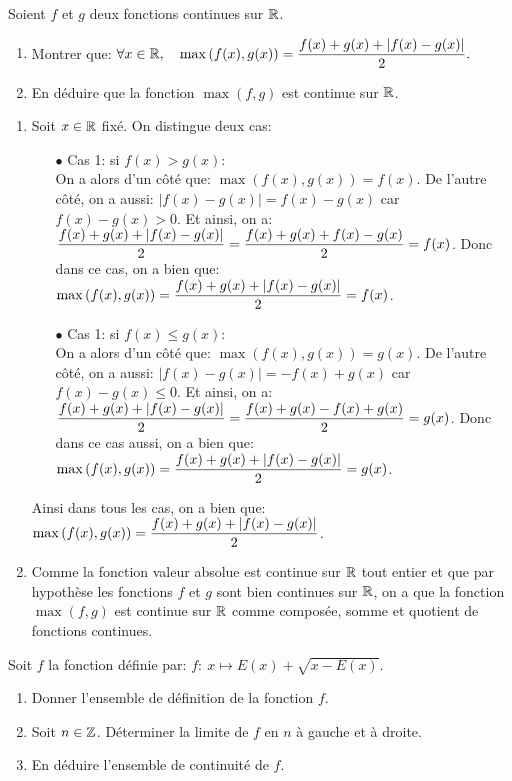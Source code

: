 \documentclass[a4paper, 11pt,reqno]{article}
\begin{document}
\begin{exercice}  \;
	Soient $f$ et $g$ deux fonctions continues sur $\mathbb{R}$.
	\begin{enumerate}
		\item Montrer que: $\forall x\in\mathbb{R},\quad \max{\left(f(x),g(x)\right)}=\displaystyle\frac{f(x)+g(x)+|f(x)-g(x)|}{2}.$
		\item En d\'eduire que la fonction $\max{(f,g)}$ est continue sur $\mathbb{R}$.
	\end{enumerate}
\end{exercice}
\begin{correction}  \;
	\begin{enumerate}
		\item Soit $x\in\mathbb{R}$ fix\'e. On distingue deux cas:
		      \begin{itemize}
			      \item[$\bullet$] Cas 1: si $f(x)>g(x)$:\\
			            \noindent On a alors d'un c\^{o}t\'e que: $\max{(f(x),g(x))}=f(x)$. De l'autre c\^{o}t\'e, on a aussi: $|f(x)-g(x)|=f(x)-g(x)$ car $f(x)-g(x)>0$. Et ainsi, on a: $\displaystyle\frac{f(x)+g(x)+|f(x)-g(x)|}{2}=\displaystyle\frac{f(x)+g(x)+f(x)-g(x)}{2}=f(x)$. Donc dans ce cas, on a bien que: $\max{(f(x),g(x))}=\displaystyle\frac{f(x)+g(x)+|f(x)-g(x)|}{2}=f(x)$.
			      \item[$\bullet$] Cas 1: si $f(x)\leq g(x)$:\\
			            \noindent On a alors d'un c\^{o}t\'e que: $\max{(f(x),g(x))}=g(x)$. De l'autre c\^{o}t\'e, on a aussi: $|f(x)-g(x)|=-f(x)+g(x)$ car $f(x)-g(x)\leq 0$. Et ainsi, on a: $\displaystyle\frac{f(x)+g(x)+|f(x)-g(x)|}{2}=\displaystyle\frac{f(x)+g(x)-f(x)+g(x)}{2}=g(x)$. Donc dans ce cas aussi, on a bien que: $\max{(f(x),g(x))}=\displaystyle\frac{f(x)+g(x)+|f(x)-g(x)|}{2}=g(x)$.
		      \end{itemize}
		      Ainsi dans tous les cas, on a bien que: $\max{(f(x),g(x))}=\displaystyle\frac{f(x)+g(x)+|f(x)-g(x)|}{2}$.
		\item Comme la fonction valeur absolue est continue sur $\mathbb{R}$ tout entier et que par hypoth\`{e}se les fonctions $f$ et $g$ sont bien continues sur $\mathbb{R}$, on a que la fonction $\max{(f,g)}$ est continue sur $\mathbb{R}$ comme compos\'ee, somme et quotient de fonctions continues.
	\end{enumerate}
\end{correction}
\begin{exercice}
Soit $f$ la fonction d\'efinie par: $f:\ x\mapsto E(x)+\sqrt{x-E(x)}$.
\begin{enumerate}
\item Donner l'ensemble de d\'efinition de la fonction $f$.
\item Soit $n\in\mathbb{Z}$. D\'eterminer la limite de $f$ en $n$ \`a gauche et \`a droite.
\item En d\'eduire l'ensemble de continuit\'e de $f$.
\end{enumerate}
\end{exercice}
\end{document}
